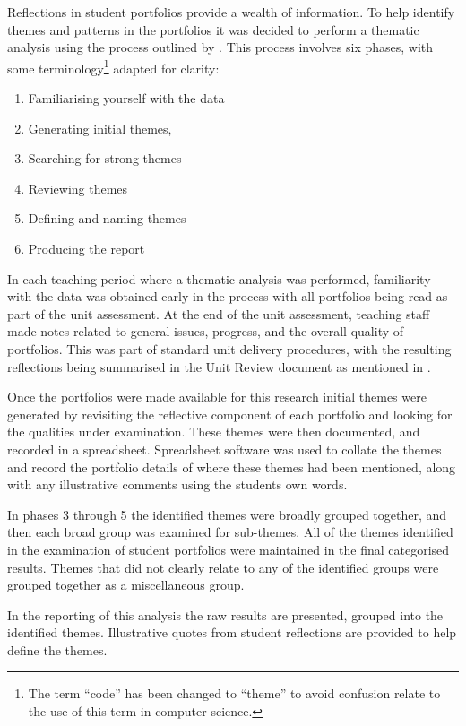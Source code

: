 Reflections in student portfolios provide a wealth of information. To help identify themes and patterns in the portfolios it was decided to perform a thematic analysis using the process outlined by \citet{Braun:2006}. This process involves six phases, with some terminology\footnote{The term ``code'' has been changed to ``theme'' to avoid confusion relate to the use of this term in computer science.} adapted for clarity:
\begin{enumerate}
  \item Familiarising yourself with the data
  \item Generating initial themes,
  \item Searching for strong themes
  \item Reviewing themes
  \item Defining and naming themes
  \item Producing the report
\end{enumerate}

In each teaching period where a thematic analysis was performed, familiarity with the data was obtained early in the process with all portfolios being read as part of the unit assessment. At the end of the unit assessment, teaching staff made notes related to general issues, progress, and the overall quality of portfolios. This was part of standard unit delivery procedures, with the resulting reflections being summarised in the Unit Review document as mentioned in .

Once the portfolios were made available for this research initial themes were generated by revisiting the reflective component of each portfolio and looking for the qualities under examination. These themes were then documented, and recorded in a spreadsheet. Spreadsheet software was used to collate the themes and record the portfolio details of where these themes had been mentioned, along with any illustrative comments using the students own words.

In phases 3 through 5 the identified themes were broadly grouped together, and then each broad group was examined for sub-themes. All of the themes identified in the examination of student portfolios were maintained in the final categorised results. Themes that did not clearly relate to any of the identified groups were grouped together as a miscellaneous group.

In the reporting of this analysis the raw results are presented, grouped into the identified themes. Illustrative quotes from student reflections are provided to help define the themes.

